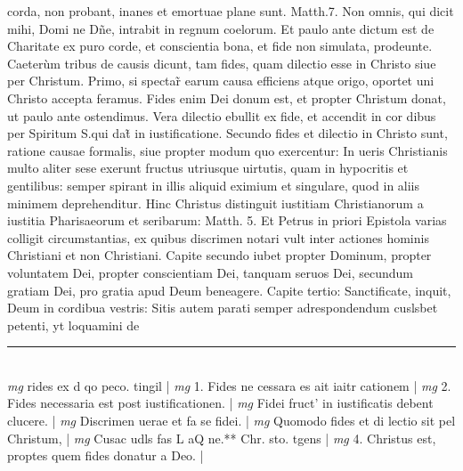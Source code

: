\documentclass{article}
\begin{document}
\begin{pages}
corda, non probant, inanes et emortuae plane sunt. Matth.7. Non omnis, qui dicit mihi, Domi ne Dñe, intrabit in regnum coelorum. Et paulo ante dictum est de Charitate ex puro corde, et conscientia bona, et fide non simulata, prodeunte. Caeterùm tribus de causis dicunt, tam fides, quam dilectio esse in Christo siue per Christum. Primo, si spectar̃ earum causa efficiens atque  origo, oportet uni Christo accepta feramus. Fides enim Dei donum est, et propter Christum donat, ut paulo ante ostendimus. Vera dilectio ebullit ex fide, et accendit in cor dibus per Spiritum S.qui dat̃ in iustificatione. Secundo fides et dilectio in Christo sunt, ratione causae formalis, siue propter modum quo exercentur: In ueris Christianis multo aliter sese exerunt fructus utriusque uirtutis, quam in hypocritis et gentilibus: semper spirant in illis aliquid eximium et singulare, quod in aliis minimem deprehenditur. Hinc Christus distinguit iustitiam Christianorum a iustitia Pharisaeorum et seribarum: Matth. 5. Et Petrus in priori Epistola varias colligit circumstantias, ex quibus discrimen notari vult inter actiones hominis Christiani et non Christiani. Capite secundo iubet propter Dominum, propter voluntatem Dei, propter conscientiam Dei, tanquam seruos Dei, secundum gratiam Dei, pro gratia apud Deum beneagere. Capite tertio: Sanctificate, inquit, Deum in cordibua vestris: Sitis autem parati semper adrespondendum cuslsbet petenti, yt loquamini de  \pend
\vspace{0.5cm}\noindent
\vspace{0.2cm}\rule{1cm}{0.2pt}\\ 
\hspace{0.2cm}\textit{mg}
\footnotesize rides ex d qo peco. tingil 
\normalsize| 
\hspace{0.2cm}\textit{mg}
\footnotesize 1. Fides ne cessara es ait iaitr cationem 
\normalsize| 
\hspace{0.2cm}\textit{mg}
\footnotesize 2. Fides necessaria est post iustificationen. 
\normalsize| 
\hspace{0.2cm}\textit{mg}
\footnotesize Fidei fruct' in iustificatis debent clucere. 
\normalsize| 
\hspace{0.2cm}\textit{mg}
\footnotesize Discrimen uerae et fa se fidei. 
\normalsize| 
\hspace{0.2cm}\textit{mg}
\footnotesize Quomodo fides et di lectio sit pel Christum, 
\normalsize| 
\hspace{0.2cm}\textit{mg}
\footnotesize Cusac udls fas L aQ ne.** Chr. sto. tgens 
\normalsize| 
\hspace{0.2cm}\textit{mg}
\footnotesize 4. Christus est, proptes quem fides donatur a Deo. 
\normalsize| 

\end{pages}
\end{document}
